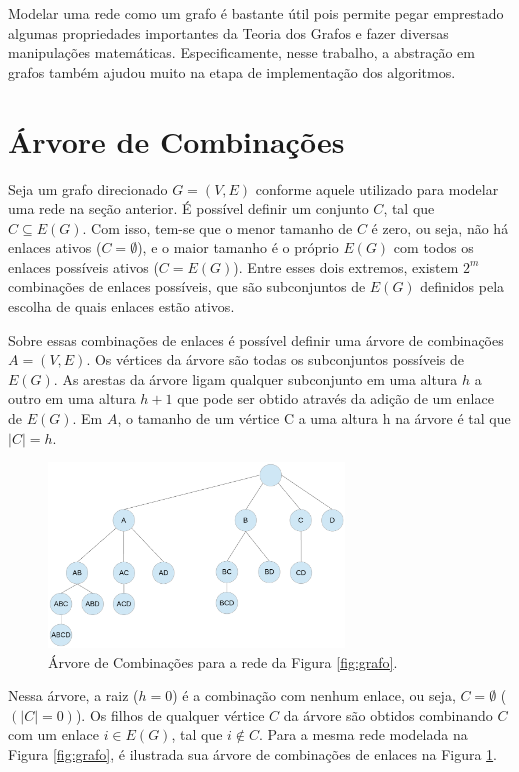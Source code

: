 Modelar uma rede como um grafo é bastante útil pois permite pegar emprestado algumas propriedades importantes da Teoria dos Grafos e fazer diversas manipulações matemáticas. Especificamente, nesse trabalho, a abstração em grafos também ajudou muito na etapa de implementação dos algoritmos.

\section{Árvore de Combinações}

Seja um grafo direcionado $G=(V,E)$ conforme aquele utilizado para modelar uma rede na seção anterior. É possível definir um conjunto $C$, tal que $C \subseteq E(G)$. Com isso, tem-se que o menor tamanho de $C$ é zero, ou seja, não há enlaces ativos ($C=\emptyset$), e o maior tamanho é o próprio $E(G)$ com todos os enlaces possíveis ativos ($C=E(G)$). Entre esses dois extremos, existem $2^m$ combinações de enlaces possíveis, que são subconjuntos de $E(G)$ definidos pela escolha de quais enlaces estão ativos.

Sobre essas combinações de enlaces é possível definir uma árvore de combinações $A=(V,E)$. Os vértices da árvore são todas os subconjuntos possíveis de $E(G)$. As arestas da árvore ligam qualquer subconjunto em uma altura $h$ a outro em uma altura $h+1$ que pode ser obtido através da adição de um enlace de $E(G)$. Em $A$, o tamanho de um vértice C a uma altura h na árvore é tal que $|C|=h$.

\begin{figure}[htb]
\centering
\includegraphics[width=0.7\textwidth]{figs/arvore}
\caption[Árvore de Combinações para a rede da Figura \ref{fig:grafo}.]
{Árvore de Combinações para a rede da Figura \ref{fig:grafo}.}
\label{fig:arvore}
\end{figure}

Nessa árvore, a raiz ($h=0$) é a combinação com nenhum enlace, ou seja, $C=\emptyset$ ($(|C|=0)$). Os filhos de qualquer vértice $C$ da árvore são obtidos combinando $C$ com um enlace $i \in E(G)$, tal que $i \notin C$. Para a mesma rede modelada na Figura \ref{fig:grafo}, é ilustrada sua árvore de combinações de enlaces na Figura \ref{fig:arvore}.

